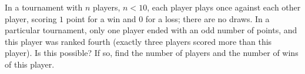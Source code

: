 In a tournament with $n$ players, $n<10$, each player plays once against each other player, scoring $1$ point for a win and $0$ for a loss; there are no draws. In a particular tournament, only one player ended with an odd number of points, and this player was ranked fourth (exactly three players scored more than this player). Is this possible? If so, find the number of players and the number of wins of this player.
